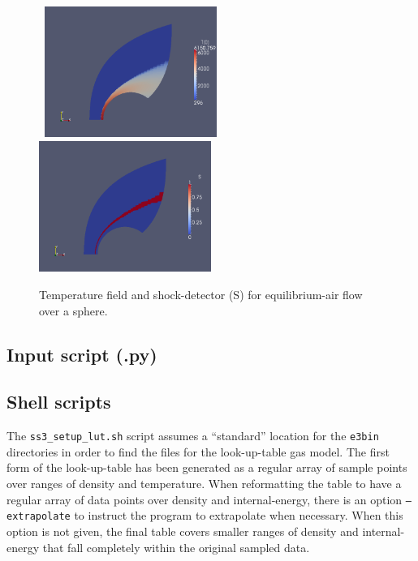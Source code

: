 \begin{figure}[htbp]
\begin{center}
\mbox{
\includegraphics[width=0.5\textwidth]{../2D/sawada_sphere/ss3-T-field.png}
\includegraphics[width=0.5\textwidth]{../2D/sawada_sphere/ss3-S-field.png}
}
\end{center}
\caption{Temperature field and shock-detector (S) for equilibrium-air flow over a sphere.}
\label{sawada-T-field-fig}
\end{figure}


\subsection{Input script (.py)}
\topbar

\bottombar

\newpage
\subsection{Shell scripts}
\label{sawada-sh-files}
The \texttt{ss3\_setup\_lut.sh} script assumes a ``standard'' location
for the \texttt{e3bin} directories in order to find the files for the look-up-table gas model.
The first form of the look-up-table has been generated as a regular array 
of sample points over ranges of density and temperature.
When reformatting the table to have a regular array of data points over
density and internal-energy, there is an option \texttt{--extrapolate} to instruct
the program to extrapolate when necessary.
When this option is not given, the final table covers smaller ranges
of density and internal-energy that fall completely within the original sampled data.\\
\topbar

\bottombar

